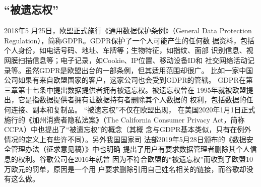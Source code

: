 \subsection{“被遗忘权”}
2018年5 月25日，欧盟正式施行《通用数据保护条例》（General Data
Protection Regulation）\cite{gdpr2018}，简称GDPR。GDPR保护了一个人可能产生的任何数
据资料，包括个人身份，如电话号码、地址、车牌等；生物特征，如指纹、面部
识别信息、视网膜扫描信息等；电子记录，如Cookie、IP位置、移动设备ID和
社交网络活动记录等。虽然GDPR是欧盟出台的一部条例，但其适用范围却很广\cite{visser2017,10.1007/978-3-030-21752-5_4,Kwak2017LetMU,Francesco2018}。
比如一家中国公司如果有来自欧盟国家的客户，这家公司也会受到GDPR的管辖。
GDPR在第三章第十七条中提出数据提供者拥有被遗忘权\cite{sarkar:hal-01824058,VILLARONGA2018304}。被遗忘权曾在
1995年就被欧盟提出，它是指数据提供者拥有让数据持有者删除其个人数据的
权利，包括数据的任何连接、副本和复制品。 “被遗忘权”不仅在欧盟出现，
在美国2020年1月1日正式施行的《加州消费者隐私法案》（The California
Consumer Privacy Act，简称CCPA）\cite{ccpa2020}中也提出了“被遗忘权”的概念（其概
念与GDPR基本类似，只有在例外情况的定义上有些许不同）。另外我国国家司
法部2019年5月28日颁布的《数据安全管理办法（征求意见稿）》\cite{gbt35273}中也明确
提出了用户有要求数据管理者删除其个人信息的权利。谷歌公司在2016年就曾
因为不符合欧盟的“被遗忘权”而收到了欧盟10万欧元的罚单，原因是一个用
户要求删除引用自己姓名相关的链接，而谷歌却没有这么做\cite{caipeiru2019}。




